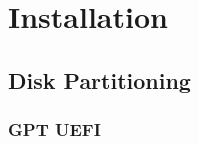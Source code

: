 \documentclass[10pt, a4paper, onecolumn, openany]{book} %
\begin{document}
\chapter{Installation}
\section{Disk Partitioning}
\subsection{GPT UEFI}
\end{document}
